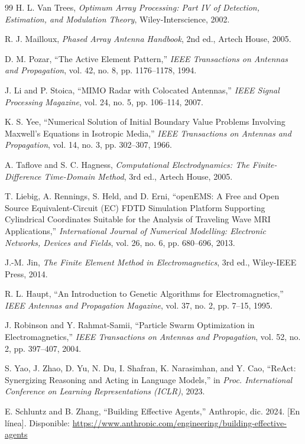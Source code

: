 \documentclass[11pt,a4paper]{article}
\begin{document}
\begin{thebibliography}{99}
H. L. Van Trees, \textit{Optimum Array Processing: Part IV of Detection, Estimation, and Modulation Theory}, Wiley-Interscience, 2002.

R. J. Mailloux, \textit{Phased Array Antenna Handbook}, 2nd ed., Artech House, 2005.

D. M. Pozar, ``The Active Element Pattern,'' \textit{IEEE Transactions on Antennas and Propagation}, vol. 42, no. 8, pp. 1176--1178, 1994.

J. Li and P. Stoica, ``MIMO Radar with Colocated Antennas,'' \textit{IEEE Signal Processing Magazine}, vol. 24, no. 5, pp. 106--114, 2007.

K. S. Yee, ``Numerical Solution of Initial Boundary Value Problems Involving Maxwell's Equations in Isotropic Media,'' \textit{IEEE Transactions on Antennas and Propagation}, vol. 14, no. 3, pp. 302--307, 1966.

A. Taflove and S. C. Hagness, \textit{Computational Electrodynamics: The Finite-Difference Time-Domain Method}, 3rd ed., Artech House, 2005.

T. Liebig, A. Rennings, S. Held, and D. Erni, ``openEMS: A Free and Open Source Equivalent-Circuit (EC) FDTD Simulation Platform Supporting Cylindrical Coordinates Suitable for the Analysis of Traveling Wave MRI Applications,'' \textit{International Journal of Numerical Modelling: Electronic Networks, Devices and Fields}, vol. 26, no. 6, pp. 680--696, 2013.

J.-M. Jin, \textit{The Finite Element Method in Electromagnetics}, 3rd ed., Wiley-IEEE Press, 2014.

R. L. Haupt, ``An Introduction to Genetic Algorithms for Electromagnetics,'' \textit{IEEE Antennas and Propagation Magazine}, vol. 37, no. 2, pp. 7--15, 1995.

J. Robinson and Y. Rahmat-Samii, ``Particle Swarm Optimization in Electromagnetics,'' \textit{IEEE Transactions on Antennas and Propagation}, vol. 52, no. 2, pp. 397--407, 2004.

S. Yao, J. Zhao, D. Yu, N. Du, I. Shafran, K. Narasimhan, and Y. Cao, ``ReAct: Synergizing Reasoning and Acting in Language Models,'' in \textit{Proc. International Conference on Learning Representations (ICLR)}, 2023.

E. Schluntz and B. Zhang, ``Building Effective Agents,'' Anthropic, dic. 2024. [En línea]. Disponible: \url{https://www.anthropic.com/engineering/building-effective-agents}

\end{thebibliography}
\end{document}
